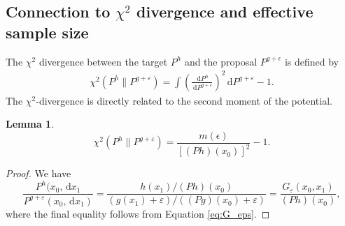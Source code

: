 \documentclass[11pt,reqno]{amsart}
\newcommand{\dd}{{\,\mathrm d}}
\newcommand{\eps}{\varepsilon}
\theoremstyle{definition}
\newtheorem{lem}[thm]{Lemma}
\newcommand{\dN}[2]{\mathcal{N}\left(#1, #2\right)}
\begin{document}
%
%
%
%
%




\subsection{Connection to  $\chi^2$ divergence and effective sample size}



The 
$\chi^2$ divergence between the target $P^h$ and the proposal $P^{g+\epsilon}$ is defined by 
\begin{align*}
  \chi^2(P^h \| P^{g+\varepsilon})
    = \int \left(\frac{\dd P^h}{\dd P^{g+\varepsilon}}\right)^{\!2} \dd P^{g+\varepsilon} - 1.
\end{align*}
The $\chi^2$-divergence is directly related to the second moment of the potential.
\begin{lem}
\[
  \chi^2(P^h \| P^{g+\varepsilon}) =  \frac{m(\epsilon)}{[(Ph)(x_0)]^2} - 1.
\]
\end{lem}
\begin{proof}
We have \[\frac{P^h(x_0, \dd x_1}{P^{g+\varepsilon}(x_0, \dd x_1)} = \frac{h(x_1)/ (Ph)(x_0)}{(g(x_1)+\eps)/((Pg)(x_0)+\eps)} = \frac{G_\eps(x_0, x_1)}{(Ph)(x_0)},\] where the final equality follows from Equation \eqref{eq:G_eps}.
\end{proof}
\end{document}
